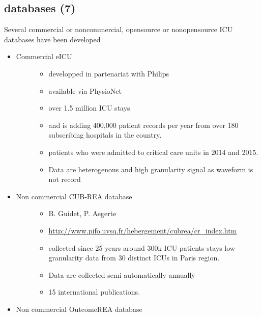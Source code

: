 \subsection{databases (7)}\label{databases-7}

Several commercial or noncommercial, opensource or nonopensource ICU
databases have been developed

\begin{itemize}
\item
  \begin{description}
  \item[Commercial eICU]
  \begin{itemize}
  \tightlist
  \item
    developped in partenariat with Philips
  \item
    available via PhysioNet
  \item
    over 1.5 million ICU stays
  \item
    and is adding 400,000 patient records per year from over 180
    subscribing hospitals in the country.
  \item
    patients who were admitted to critical care units in 2014 and 2015.
  \item
    Data are heterogenous and high granularity signal as waveform is not
    record
  \end{itemize}
  \end{description}
\item
  \begin{description}
  \item[Non commercial CUB-REA database]
  \begin{itemize}
  \tightlist
  \item
    B. Guidet, P. Aegerte
  \item
    \url{http://www.pifo.uvsq.fr/hebergement/cubrea/cr_index.htm}
  \item
    collected since 25 years around 300k ICU patients stays low
    granularity data from 30 distinct ICUs in Paris region.
  \item
    Data are collected semi automatically annually
  \item
    15 international publications.
  \end{itemize}
  \end{description}
\item
  \begin{description}
  \item[Non commercial OutcomeREA database]
  \begin{itemize}

\end{itemize}
\end{description}
\end{itemize}
